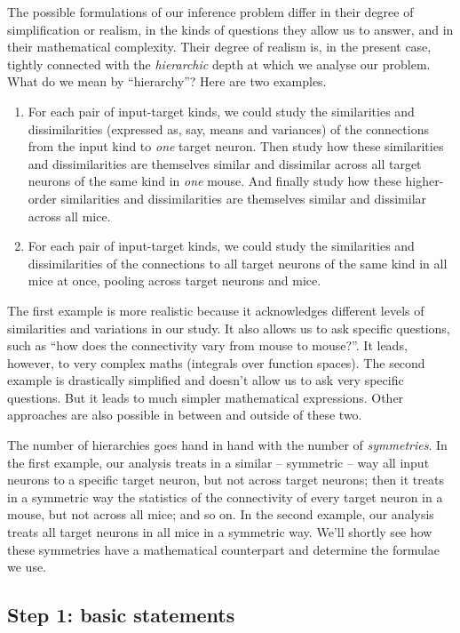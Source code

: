 \documentclass[\ifafour a4paper,12pt,\else a5paper,10pt,\fi%
onecolumn,oneside,article,%
british%
]{memoir}
\theoremstyle{remark}
\theoremstyle{innote}
\renewcommand*{\|}[1][]{\nonscript\,#1\vert\nonscript\;\mathopen{}}
\begin{document}
The possible formulations of our inference problem differ in their degree
of simplification or realism, in the kinds of questions they allow us to
answer, and in their mathematical complexity. Their degree of realism is,
in the present case, tightly connected with the \emph{hierarchic} depth at
which we analyse our problem. What do we mean by \enquote{hierarchy}? Here
are two examples.
\begin{enumerate}[label=(\roman*)]
\item \label{item:3-level}For each pair of input-target kinds, we could
  study the similarities and dissimilarities (expressed as, say, means and
  variances) of the connections from the input kind to \emph{one} target
  neuron. Then study how these similarities and dissimilarities are
  themselves similar and dissimilar across all target neurons of the same
  kind in \emph{one} mouse. And finally study how these higher-order
  similarities and dissimilarities are themselves similar and dissimilar
  across all mice.
\item \label{item:1-level}For each pair of input-target kinds, we could
  study the similarities and dissimilarities of the connections to all
  target neurons of the same kind in all mice at once, pooling across
  target neurons and mice.
\end{enumerate}
The first example is more realistic because it acknowledges different
levels of similarities and variations in our study. It also allows us to
ask specific questions, such as \enquote{how does the connectivity vary
  from mouse to mouse?}. It leads, however, to very complex maths
(integrals over function spaces). The second example is drastically
simplified and doesn't allow us to ask very specific questions. But it
leads to much simpler mathematical expressions. Other approaches are also
possible in between and outside of these two.

The number of hierarchies goes hand in hand with the number of
\emph{symmetries}. In the first example, our analysis treats in a similar
-- symmetric -- way all input neurons to a specific target neuron, but not
across target neurons; then it treats in a symmetric way the statistics of
the connectivity of every target neuron in a mouse, but not across all
mice; and so on. In the second example, our analysis treats all target
neurons in all mice in a symmetric way. We'll shortly see how these symmetries
have a mathematical counterpart and determine the formulae we use.

\subsection{Step 1: basic statements}
\label{sec:step_statements}
\end{document}
